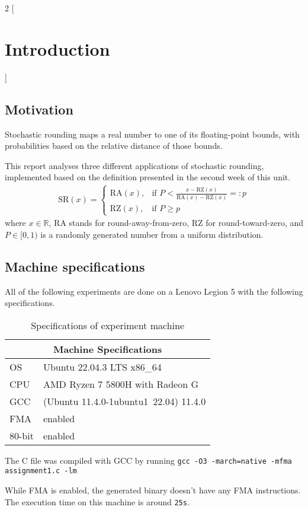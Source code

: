 \documentclass[a4paper]{article} %
\begin{document}
\begin{multicols}{2}
[
\section{Introduction}
]

\subsection{Motivation}
Stochastic rounding maps a real number to one of its floating-point bounds, with probabilities based on the relative distance of those bounds.
\par
This report analyses three different applications of stochastic rounding, implemented based on the definition presented in the second week of this unit.
\begin{align} \label{eq:1}
\text{SR}(x)=\left \{
\begin{array}{ll}
    \text{RA}(x), & \text{if } P < \frac{x - \text{RZ}(x)}{\text{RA}(x) - \text{RZ}(x)}=:p \\
    \text{RZ}(x), &  \text{if } P \ge p
\end{array}
\right.
\end{align}
where $x \in \mathbb{R}$, $\text{RA}$ stands for round-away-from-zero, $\text{RZ}$ for round-toward-zero, and $P \in [0, 1)$ is a randomly generated number from a uniform distribution.

\columnbreak
\subsection{Machine specifications}
All of the following experiments are done on a Lenovo Legion 5 with the following specifications.
\begin{table}[H]
\centering
\begin{tabular}{ |p{1cm}||p{6cm}|  }
 \hline
 \multicolumn{2}{|c|}{Machine Specifications} \\
 \hline
 OS & Ubuntu 22.04.3 LTS x86\_64\\
 \hline
 CPU & AMD Ryzen 7 5800H with Radeon G\\
 \hline
 GCC & (Ubuntu 11.4.0-1ubuntu1~22.04) 11.4.0 \\
 \hline
 FMA & enabled \\
 \hline
 80-bit & enabled \\
 \hline
\end{tabular}
\caption{Specifications of experiment machine}
\label{table:1}
\end{table}
\par
The C file was compiled with GCC by running
\verb|gcc -O3 -march=native -mfma assignment1.c -lm|
\par
While FMA is enabled, the generated binary doesn't have any FMA instructions. The execution time on this machine is around \verb|25s|.
\end{multicols}
\end{document}
